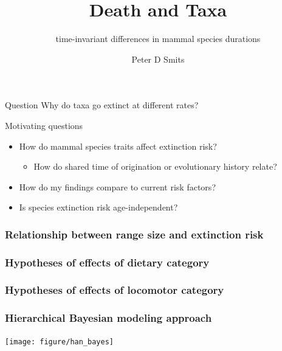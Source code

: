 \documentclass{beamer}
\title{Death and Taxa}
\subtitle{time-invariant differences in mammal species durations}
\author{Peter D Smits}
\institute{Committee on Evolutionary Biology, University of Chicago}
\begin{document}
\begin{frame}
  \maketitle
\end{frame}

\begin{frame}
  \begin{alertblock}{Question}
    Why do taxa go extinct at different rates?
  \end{alertblock}
\end{frame}

\begin{frame}
  \begin{block}{Motivating questions}
    \begin{itemize}
      \item How do mammal species traits affect extinction risk?
        \begin{itemize}
          \item How do shared time of origination or evolutionary history relate?
        \end{itemize}
      \item How do my findings compare to current risk factors?
      \item Is species extinction risk age-independent?
    \end{itemize}
  \end{block}
\end{frame}

\begin{frame}
  \frametitle{Relationship between range size and extinction risk}
\end{frame}

\begin{frame}
  \frametitle{Hypotheses of effects of dietary category}
\end{frame}

\begin{frame}
  \frametitle{Hypotheses of effects of locomotor category}
\end{frame}

\begin{frame}
  \frametitle{Hierarchical Bayesian modeling approach}

  \texttt{[image: figure/han\_bayes]}

  \tiny{}
\end{frame}
\end{document}
